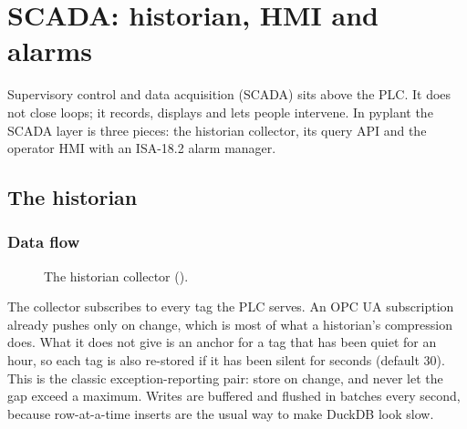 \chapter{SCADA: historian, HMI and alarms}
\label{ch:scada}

Supervisory control and data acquisition (SCADA) sits above the PLC. It does
not close loops; it records, displays and lets people intervene. In pyplant
the SCADA layer is three pieces: the historian collector, its query API and
the operator HMI with an ISA-18.2 alarm manager.

\section{The historian}

\subsection{Data flow}

\begin{figure}[htbp]
\centering
{}
\caption{The historian collector ().}
\label{fig:historian}
\end{figure}

The collector subscribes to every tag the PLC serves. An OPC UA subscription
already pushes only on change, which is most of what a historian's
compression does. What it does not give is an anchor for a tag that has been
quiet for an hour, so each tag is also re-stored if it has been silent for
 seconds (default 30). This is the classic exception-reporting
pair: store on change, and never let the gap exceed a maximum. Writes are
buffered and flushed in batches every second, because row-at-a-time inserts
are the usual way to make DuckDB look slow.

